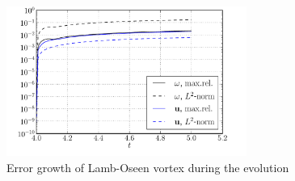 	\begin{figure}[p]
	\centering
	\includegraphics[width=0.7\textwidth]{figures/lagrangian/lambOseen_convection_errorGrowth_compressed.pdf}
	\caption{Error growth of Lamb-Oseen vortex during the evolution}
	\label{fig:lambOseen_convection_errorGrowth_compressed}
	\end{figure}
	
